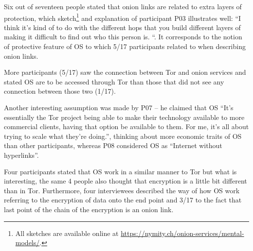 Six out of seventeen people stated that onion links are related to extra layers of protection, which sketch\footnote{All sketches are available online at
\url{https://nymity.ch/onion-services/mental-models/}.} and explanation of participant P03 illustrates well:   “I think it's kind of to do with the different hops that you build different layers of making it difficult to find out who this person is. “. It corresponds to the notion of protective feature of OS to which 5/17 participants related to when describing onion links. 


More participants (5/17) saw the connection between Tor and onion services and stated OS are to be accessed through Tor than those that did not see any connection between those two (1/17).

Another interesting assumption was made by P07 – he claimed that OS 
“It's essentially the Tor project being able to make their technology available to more commercial clients, having that option be available to them. For me, it's all about trying to scale what they're doing.”, thinking about more economic traits of OS than other participants, whereas P08 considered OS as “Internet without hyperlinks”.

Four participants stated that OS work in a similar manner to Tor but what is interesting, the same 4 people also thought that encryption is a little bit different than in Tor. Furthermore, four interviewees described the way of how OS work referring to the encryption of data onto the end point and 3/17 to the fact that last point of the chain of the encryption is an onion link. 



